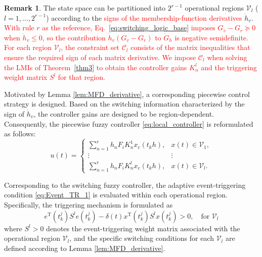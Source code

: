\documentclass[preprint,review,fleqn,sort&compress,3p]{elsarticle}
\theoremstyle{definition} %
\theoremstyle{definition}%
\newtheorem{rem}{Remark}[section]
\begin{document}
	\begin{rem} \label{rem:Vl_definition}
		The state space can be partitioned into $2^{r-1}$ operational regions $\mathcal{V}_l$ ($l = 1,\ldots,2^{r-1}$) according to the \textcolor{red}{signs of the membership-function derivatives} $\dot{h}_v$.
\textcolor{red}{With rule $r$ as the reference, Eq.~\eqref{eq:switching_logic_base} imposes $G_v-G_r\succeq 0$ when $\dot h_v\leq 0$, so the contribution $\dot h_v(G_v-G_r)$ to $\dot G_h$ is negative semidefinite. For each region $\mathcal V_l$, the constraint set $\mathcal C_l$ consists of the matrix inequalities that ensure the required sign of each matrix derivative. We impose $\mathcal C_l$ when solving the LMIs of Theorem~\ref{thm3} to obtain the controller gains $K_n^l$ and the triggering weight matrix $S^l$ for that region.}
	\end{rem}
	
	Motivated by Lemma \ref{lem:MFD_derivative}, a corresponding piecewise control strategy is designed. Based on the switching information characterized by the sign of $\dot h_v$, the controller gains are designed to be region-dependent. Consequently, the piecewise fuzzy controller \eqref{eq:local_controller} is reformulated as follows:
	\begin{equation} \label{eq:switching_controller}
		u(t) =
		\begin{cases}
			\sum_{n=1}^{r} h_n F_i K_{n}^1 x_c(t_k h), & x(t)\in \mathcal{V}_1, \\
			\vdots & \vdots \\
			\sum_{n=1}^{r} h_n F_i K_{n}^l x_c(t_k h), & x(t)\in \mathcal{V}_l.
		\end{cases}
	\end{equation}
	
	Corresponding to the switching fuzzy controller, the adaptive event-triggering condition \eqref{eq:Event_TR_1} is evaluated within each operational region. Specifically, the triggering mechanism is formulated as
	\begin{equation} 
		e^{\mathrm{T}}(t^j_{k}) S^l e(t^j_{k}) - \delta(t) x^{\mathrm{T}}(t_{k}^j) S^l x(t_{k}^j) > 0, \quad \text{for } \mathcal{V}_l
	\end{equation}
	where $S^l>0$ denotes the event-triggering weight matrix associated with the operational region $\mathcal{V}_l$, and the specific switching conditions for each $\mathcal{V}_l$ are defined according to Lemma \ref{lem:MFD_derivative}.
	
\end{document}
